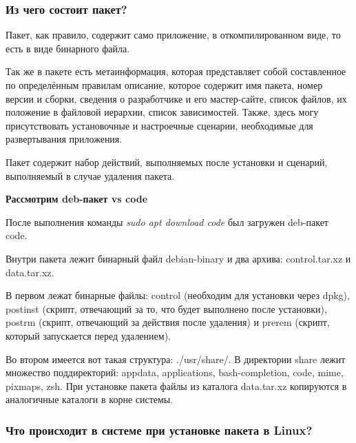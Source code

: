 \documentclass[oneside, final, 14pt]{extreport} %
\begin{document}
\subsubsection{Из чего состоит пакет?}

Пакет, как правило, содержит само приложение, в откомпилированном  виде, то есть в виде бинарного файла.

Так же в пакете есть метаинформация, которая представляет собой составленное по определённым правилам описание, которое содержит имя пакета, номер версии и сборки, сведения о разработчике и его мастер-сайте, список файлов, их положение в файловой иерархии, список зависимостей. Также, здесь могу присутствовать установочные и настроечные сценарии, необходимые для развертывания приложения.

Пакет содержит набор действий, выполняемых после установки и сценарий, выполняемый в случае удаления пакета.

\vspace*{\baselineskip}

\textbf{Рассмотрим deb-пакет vs code}

После выполнения команды \textit{sudo apt download code} 
был загружен deb-пакет code.

Внутри пакета лежит бинарный файл debian-binary и два архива: control.tar.xz и data.tar.xz.

В первом лежат бинарные файлы:
control (необходим для установки через dpkg), 
postinst (скрипт, отвечающий за то, что будет выполнено после установки), 
postrm (скрипт, отвечающий за действия после удаления) и prerem (скрипт, который запускается перед удалением). 

Во втором имеется вот такая структура: ./usr/share/. В директории share лежит
множество поддиректорий: appdata, applications, bash-completion, code, mime, pixmaps,
zsh.  При установке пакета файлы из каталога data.tar.xz копируются в аналогичные каталоги в корне системы.

\subsubsection{Что происходит в системе при установке пакета в Linux?}
\end{document}
